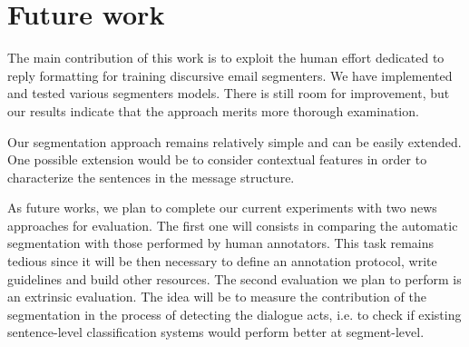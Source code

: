 

\section{Future work}
\label{sec:futureWork}

The main contribution of this work is to exploit the human effort dedicated to reply formatting for training discursive email segmenters. 
We have implemented and tested various segmenters models. 
There is still room for improvement, but our results indicate that the approach merits more thorough examination.

Our segmentation approach remains relatively simple and can be easily extended. One possible extension would be to consider contextual features in order to characterize the sentences in the message structure.

As future works, we plan to complete our current experiments with two news approaches for evaluation. The first one will consists in comparing the automatic segmentation with those performed by human annotators.
This task remains tedious since it will be then necessary to define an annotation protocol, write guidelines and build other resources.
The second evaluation we plan to perform is an extrinsic evaluation. The idea will be to measure the contribution of the segmentation in the process of detecting the dialogue acts, i.e. to check if existing sentence-level classification systems would perform better at segment-level.

